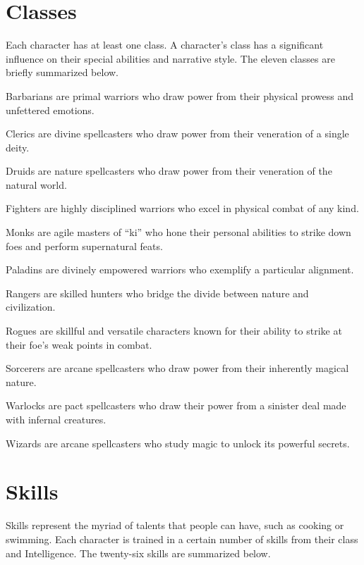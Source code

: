 \section{Classes}
  Each character has at least one class.
  A character's class has a significant influence on their special abilities and narrative style.
  The eleven classes are briefly summarized below.

  \begin{raggeditemize}
    \item Barbarians are primal warriors who draw power from their physical prowess and unfettered emotions.
    \item Clerics are divine spellcasters who draw power from their veneration of a single deity.
    \item Druids are nature spellcasters who draw power from their veneration of the natural world.
    \item Fighters are highly disciplined warriors who excel in physical combat of any kind.
    \item Monks are agile masters of ``ki'' who hone their personal abilities to strike down foes and perform supernatural feats.
    \item Paladins are divinely empowered warriors who exemplify a particular alignment.
    \item Rangers are skilled hunters who bridge the divide between nature and civilization.
    \item Rogues are skillful and versatile characters known for their ability to strike at their foe's weak points in combat.
    \item Sorcerers are arcane spellcasters who draw power from their inherently magical nature.
    \item Warlocks are pact spellcasters who draw their power from a sinister deal made with infernal creatures.
    \item Wizards are arcane spellcasters who study magic to unlock its powerful secrets.
  \end{raggeditemize}

\section{Skills}
  Skills represent the myriad of talents that people can have, such as cooking or swimming.
  Each character is trained in a certain number of skills from their class and Intelligence.
  The twenty-six skills are summarized below.

